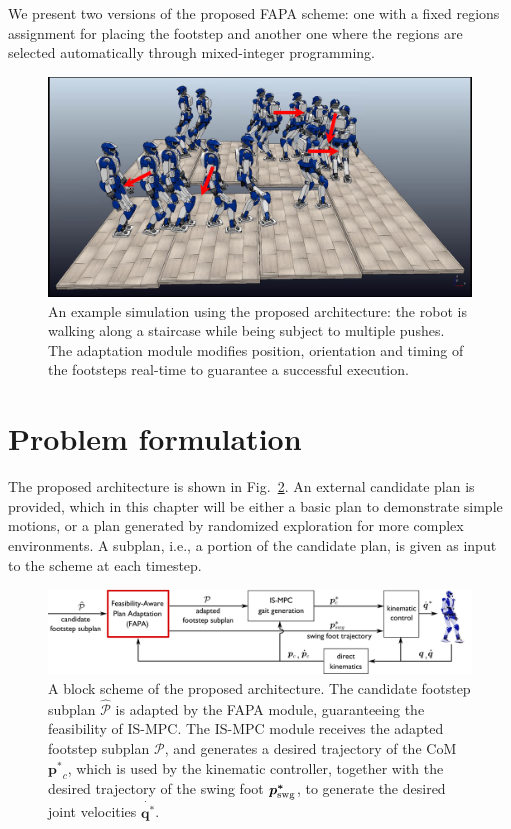 We present two versions of the proposed FAPA scheme: one with a fixed regions
assignment for placing the footstep and another one where the regions are
selected automatically through mixed-integer programming.

\begin{figure}
    \centering
    \includegraphics[trim={0.5cm 1.5cm 2cm 0.1cm},clip,width=0.9\columnwidth]{figures/strobo-staircase-with-pushes-2.png}
    \caption{An example simulation using the proposed architecture: the robot is walking along a staircase while being subject to multiple pushes. The adaptation module modifies position, orientation and timing of the footsteps real-time to guarantee a successful execution.}
    \label{fig:FAPA:two-patches-mixed-integer-snapshots}
\end{figure}

\section{Problem formulation} 
\label{sec:FAPA:ProblemFormulation}
The proposed architecture is shown in Fig.~\ref{fig:FAPA:block_scheme}.
An external candidate plan is provided, which in this chapter will be either
a basic plan to demonstrate simple motions, or a plan generated by randomized
exploration \cite{Cipriano2023RAS} for more complex environments.
A subplan, i.e., a portion of the candidate plan, is given as input to the
scheme at each timestep.

\begin{figure}
    \centering\includegraphics[width=\textwidth]{figures/BlockScheme-NLP-STA.pdf}
    \caption{A block scheme of the proposed architecture. The candidate footstep subplan $\mathcal{\hat{P}}$ is adapted by the FAPA module, guaranteeing the feasibility of IS-MPC. The IS-MPC module receives the adapted footstep subplan $\mathcal{P}$, and generates a desired trajectory of the CoM $\bm{p^*}_c$, which is used by the kinematic controller, together with the desired trajectory of the swing foot $\bm{p^*}_{\rm swg}$, to generate the desired joint velocities $\dot{\bm{q^*}}$.}
    \label{fig:FAPA:block_scheme}
    \end{figure}

